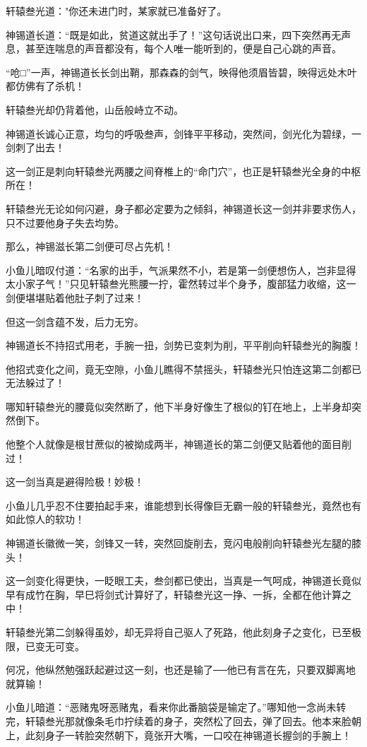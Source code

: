 \documentclass[12pt,oneside]{book}
\begin{document}
轩辕叁光道："你还未进门时，某家就已准备好了。

神锡道长道：``既是如此，贫道这就出手了！''这句话说出口来，四下突然再无声息，甚至连喘息的声音都没有，每个人唯一能听到的，便是自己心跳的声音。

``呛□''一声，神锡道长长剑出鞘，那森森的剑气，映得他须眉皆碧，映得远处木叶都仿佛有了杀机！

轩辕叁光却仍背着他，山岳般峙立不动。

神锡道长诚心正意，均匀的呼吸叁声，剑锋平平移动，突然间，剑光化为碧绿，一剑刺了出去！

这一剑正是刺向轩辕叁光两腰之间脊椎上的``命门穴''，也正是轩辕叁光全身的中枢所在！

轩辕叁光无论如何闪避，身子都必定要为之倾斜，神锡道长这一剑并非要求伤人，只不过要他身子失去均势。

那么，神锡滋长第二剑便可尽占先机！

小鱼儿暗叹付道：``名家的出手，气派果然不小，若是第一剑便想伤人，岂非显得太小家子气！''只见轩辕叁光熊腰一拧，霍然转过半个身予，腹部猛力收缩，这一剑便堪堪贴着他肚子刺了过来！

但这一剑含蕴不发，后力无穷。

神锡道长不持招式用老，手腕一扭，剑势已变刺为削，平平削向轩辕叁光的胸腹！

他招式变化之间，竟无空隙，小鱼儿瞧得不禁摇头，轩辕叁光只怕连这第二剑都已无法躲过了！

哪知轩辕叁光的腰竟似突然断了，他下半身好像生了根似的钉在地上，上半身却突然倒下。

他整个人就像是根甘蔗似的被拗成两半，神锡道长的第二剑便又贴着他的面目削过！

这一剑当真是避得险极！妙极！

小鱼儿几乎忍不住要拍起手来，谁能想到长得像巨无霸一般的轩辕叁光，竟然也有如此惊人的软功！

神锡道长徽微一笑，剑锋又一转，突然回旋削去，竞闪电般削向轩辕叁光左腿的膝头！

这一剑变化得更快，一眨眼工夫，叁剑都已使出，当真是一气呵成，神锡道长竟似早有成竹在胸，早巳将剑式计算好了，轩辕叁光这一挣、一拆，全都在他计算之中！

轩辕叁光第二剑躲得虽妙，却无异将自己驱人了死路，他此刻身子之变化，已至极限，已变无可变。

何况，他纵然勉强跃起避过这一刻，也还是输了──他已有言在先，只要双脚离地就算输！

小鱼儿暗道：``恶赌鬼呀恶赌鬼，看来你此番脑袋是输定了。''哪知他一念尚未转完，轩辕叁光那就像条毛巾拧续着的身子，突然松了回去，弹了回去。他本来脸朝上，此刻身子一转脸突然朝下，竟张开大嘴，一口咬在神锡道长握剑的手腕上！
\end{document}
